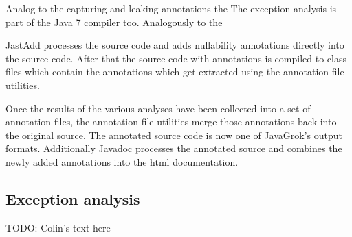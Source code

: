 Analog to the capturing and leaking annotations the 
The exception analysis is part of the Java 7 compiler too. Analogously to the

JastAdd processes the source code and adds nullability annotations
directly into the source code. After that the source code with annotations
is compiled to class files which contain the annotations which  
get extracted using the annotation file utilities.

Once the results of the various analyses have been collected into a set of
annotation files, the annotation file utilities merge
those annotations back into the original source. The annotated source
code is now one of JavaGrok's output formats. Additionally Javadoc processes
the annotated source and combines the newly added annotations into the html
documentation.

\subsection{Exception analysis}
\label{sec:exception_analysis}
TODO: Colin's text here